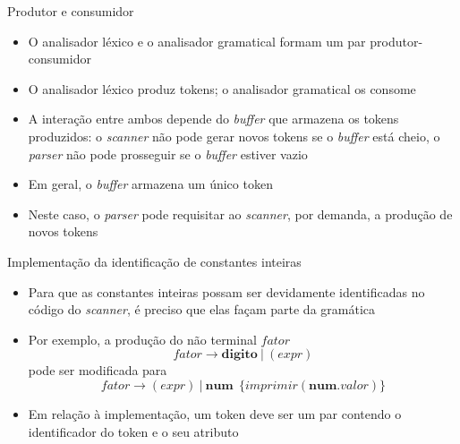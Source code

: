 \begin{frame}[fragile]{Produtor e consumidor}

    \begin{itemize}
        \item O analisador léxico e o analisador gramatical formam um par produtor-consumidor

        \item O analisador léxico produz tokens; o analisador gramatical os consome

        \item A interação entre ambos depende do \textit{buffer} que armazena os tokens produzidos: o \textit{scanner} não pode gerar novos tokens se o
            \textit{buffer} está cheio, o \textit{parser} não pode prosseguir se o \textit{buffer} estiver vazio

        \item Em geral, o \textit{buffer} armazena um único token

        \item Neste caso, o \textit{parser} pode requisitar ao \textit{scanner}, por demanda, a produção de novos tokens
    \end{itemize}

\end{frame}

\begin{frame}[fragile]{Implementação da identificação de constantes inteiras}

    \begin{itemize}
        \item Para que as constantes inteiras possam ser devidamente identificadas no código do \textit{scanner}, é preciso que elas façam parte da
            gramática

        \item Por exemplo, a produção do não terminal $fator$ 
        \[
            fator \to \mathbf{digito}\ |\ (expr)
        \]
        pode ser modificada para
        \[
            fator \to (expr)\ |\ \mathbf{num}\ \ \{imprimir(\mathbf{num}.valor)\}
        \]

        \item Em relação à implementação, um token deve ser um par contendo o identificador do token e o seu atributo
    \end{itemize}

\end{frame}

